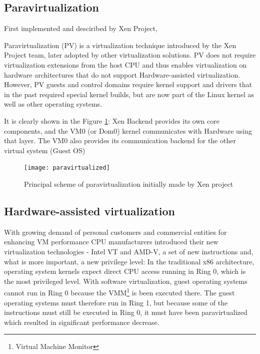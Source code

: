 \subsection{Paravirtualization}

First implemented and desciribed by Xen Project,

\begin{definition}
Paravirtualization (PV) is a virtualization technique
introduced by the Xen Project team, later adopted by other
virtualization solutions. PV does not require virtualization extensions from
the host CPU and thus enables virtualization on hardware architectures that do
not support Hardware-assisted virtualization.
However, PV guests and control domains require kernel
support and drivers that in the past required special kernel builds,
but are now part of the Linux kernel as well as other
operating systems\cite{ParavirtualizationDefinition}.
\end{definition}

It is clearly shown in the Figure \ref{fig:ParavirtualizationPic}:
Xen Backend provides its own core components, and the VM0 (or Dom0)
kernel communicates
with Hardware using that layer. The VM0 also provides
its communication backend for the other virtual system (Guest OS)
\begin{figure}
\texttt{[image: paravirtualized]}
\caption{Principal scheme of paravirtualization initially made by Xen project}
\cite{ParavirtualizationPic}
\label{fig:ParavirtualizationPic}
\end{figure}

\subsection{Hardware-assisted virtualization}

With growing demand of personal customers
and commercial entities for enhancing VM performance
CPU manufacturers introduced
their new virtualization technologies - Intel VT and AMD-V,
a set of new instructions and, what is more important, a new privilege level:
In the traditional x86 architecture,
operating system kernels expect direct CPU access
running in Ring 0, which is the most privileged level.
With software virtualization, guest operating
systems cannot run in Ring 0 because
the VMM\footnote{Virtual Machine Monitor} is been executed there.
The guest operating systems must therefore run in Ring 1,
but because some of the instructions must still be executed in Ring 0,
it must have been paravirtualized which resulted
in significant performance decrease\cite{HWAssistedVirt}.


